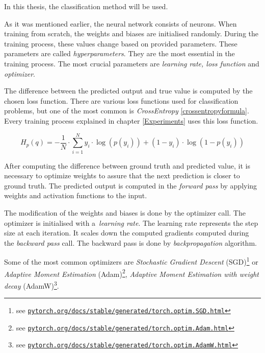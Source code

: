     In this thesis, the classification method will be used. 
    
    As it was mentioned earlier, the neural network consists of neurons. When training from scratch, the weights and biases are initialised randomly. During the training process, these values change based on provided parameters. These parameters are called \textit{hyperparameters}. They are the most essential in the training process. The most crucial parameters are \textit{learning rate, loss function} and \textit{optimizer}.

    The difference between the predicted output and true value is computed by the chosen loss function. There are various loss functions used for classification problems, but one of the most common is \textit{CrossEntropy} \ref{crossentropyformula}. Every training process explained in chapter \ref{Experiments} uses this loss function. 

    \begin{equation}\label{crossentropyformula}
        H_p(q)=-\frac{1}{N} \cdot \sum_{i=1}^N y_i \cdot \log \left(p\left(y_i\right)\right)+\left(1-y_i\right) \cdot \log \left(1-p\left(y_i\right)\right)
    \end{equation}

    After computing the difference between ground truth and predicted value, it is necessary to optimize weights to assure that the next prediction is closer to ground truth. The predicted output is computed in the \textit{forward pass} by applying weights and activation functions to the input. 

    The modification of the weights and biases is done by the optimizer call. The optimizer is initialised with a~\textit{learning rate}. The learning rate represents the step size at each iteration. It scales down the computed gradients computed during the \textit{backward pass} call. The backward pass is done by \textit{backpropagation} algorithm. 

    Some of the most common optimizers are \textit{Stochastic Gradient Descent} (SGD)\footnote{see
        \href{pytorch.org/docs/stable/generated/torch.optim.SGD.html}{\texttt{pytorch.org/docs/stable/generated/torch.optim.SGD.html}}} or 
    \textit{Adaptive Moment Estimation} (Adam)\footnote{see \href{https://pytorch.org/docs/stable/generated/torch.optim.Adam.html}{\texttt{pytorch.org/docs/stable/generated/torch.optim.Adam.html}}}, 
    \textit{Adaptive Moment Estimation with weight decay} (AdamW)\footnote{see
    \href{pytorch.org/docs/stable/generated/torch.optim.AdamW.html}{\texttt{pytorch.org/docs/stable/generated/torch.optim.AdamW.html}}}.

